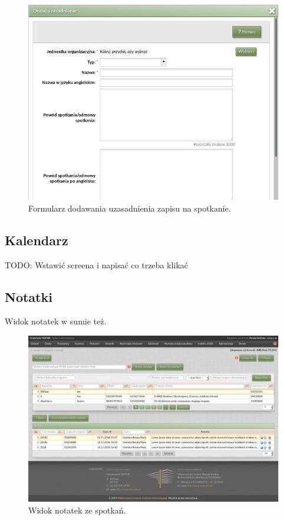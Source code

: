 \documentclass[licencjacka]{pracamgr}
\begin{document}
\begin{itemize}
\begin{figure}[b!]
  \includegraphics[width=\linewidth]{formularz_uzasadnien.jpg}
  \caption{Formularz dodawania uzasadnienia zapisu na spotkanie.}
  \label{fig:formularz_uzasadnienia}
\end{figure}

\subsection{Kalendarz}
TODO: Wstawić screena i napisać co trzeba klikać

\subsection{Notatki}
Widok notatek w sumie też.

\begin{figure}[b!]
  \includegraphics[width=\linewidth]{widok_notatek.jpg}
  \caption{Widok notatek ze spotkań.}
  \label{fig:notatki}
\end{figure}


\end{itemize}
\end{document}
